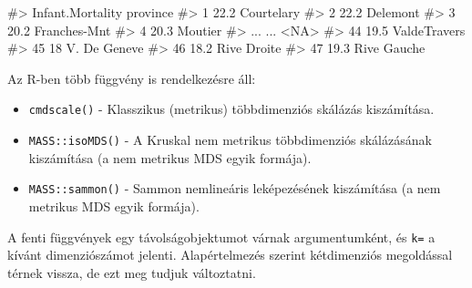 \documentclass[
  letterpaper,
]{krantz}
\makeatletter
\newenvironment{Shaded}{\begin{snugshade}}{\end{snugshade}}
\newcommand{\AttributeTok}[1]{\textcolor[rgb]{0.40,0.45,0.13}{#1}}
\newcommand{\CommentTok}[1]{\textcolor[rgb]{0.37,0.37,0.37}{#1}}
\newcommand{\ConstantTok}[1]{\textcolor[rgb]{0.56,0.35,0.01}{#1}}
\newcommand{\DecValTok}[1]{\textcolor[rgb]{0.68,0.00,0.00}{#1}}
\newcommand{\FunctionTok}[1]{\textcolor[rgb]{0.28,0.35,0.67}{#1}}
\newcommand{\NormalTok}[1]{\textcolor[rgb]{0.00,0.23,0.31}{#1}}
\newcommand{\OtherTok}[1]{\textcolor[rgb]{0.00,0.23,0.31}{#1}}
\newcommand{\SpecialCharTok}[1]{\textcolor[rgb]{0.37,0.37,0.37}{#1}}
\newcommand{\StringTok}[1]{\textcolor[rgb]{0.13,0.47,0.30}{#1}}
\providecommand{\tightlist}{%
  \setlength{\itemsep}{0pt}\setlength{\parskip}{0pt}}\usepackage{longtable,booktabs,array}
\newenvironment{kframe}{%
\medskip{}
\setlength{\fboxsep}{.8em}
 \def\at@end@of@kframe{}%
 \ifinner\ifhmode%
  \def\at@end@of@kframe{\end{minipage}}%
  \begin{minipage}{\columnwidth}%
 \fi\fi%
 \def\FrameCommand##1{\hskip\@totalleftmargin \hskip-\fboxsep
 \colorbox{shadecolor}{##1}\hskip-\fboxsep
     \hskip-\linewidth \hskip-\@totalleftmargin \hskip\columnwidth}%
 \MakeFramed {\advance\hsize-\width
   \@totalleftmargin\z@ \linewidth\hsize
   \@setminipage}}%
 {\par\unskip\endMakeFramed%
 \at@end@of@kframe}
\renewenvironment{Shaded}{\begin{kframe}}{\end{kframe}}
\makeatother
\begin{document}
\begin{Shaded}
\begin{Highlighting}[]
\CommentTok{\#\textgreater{}     Infant.Mortality     province}
\CommentTok{\#\textgreater{} 1               22.2   Courtelary}
\CommentTok{\#\textgreater{} 2               22.2     Delemont}
\CommentTok{\#\textgreater{} 3               20.2 Franches{-}Mnt}
\CommentTok{\#\textgreater{} 4               20.3      Moutier}
\CommentTok{\#\textgreater{} ...              ...         \textless{}NA\textgreater{}}
\CommentTok{\#\textgreater{} 44              19.5 ValdeTravers}
\CommentTok{\#\textgreater{} 45                18 V. De Geneve}
\CommentTok{\#\textgreater{} 46              18.2  Rive Droite}
\CommentTok{\#\textgreater{} 47              19.3  Rive Gauche}
\end{Highlighting}
\end{Shaded}

Az R-ben több függvény is rendelkezésre áll:

\begin{itemize}
\tightlist
\item
  \texttt{cmdscale()} - Klasszikus (metrikus) többdimenziós skálázás
  kiszámítása.
\item
  \texttt{MASS::isoMDS()} - A Kruskal nem metrikus többdimenziós
  skálázásának kiszámítása (a nem metrikus MDS egyik formája).
\item
  \texttt{MASS::sammon()} - Sammon nemlineáris leképezésének kiszámítása
  (a nem metrikus MDS egyik formája).
\end{itemize}

A fenti függvények egy távolságobjektumot várnak argumentumként, és
\texttt{k=} a kívánt dimenziószámot jelenti. Alapértelmezés szerint
kétdimenziós megoldással térnek vissza, de ezt meg tudjuk változtatni.

\begin{Shaded}
\end{Shaded}
\end{document}
